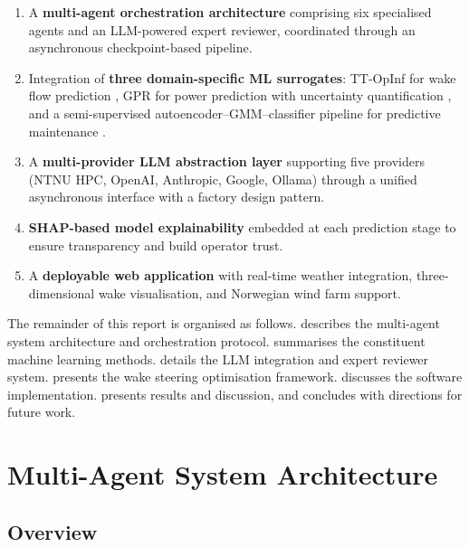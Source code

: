 \documentclass[12pt]{article}
\begin{document}
\begin{enumerate}[leftmargin=*]
    \item A \textbf{multi-agent orchestration architecture} comprising six specialised agents and an LLM-powered expert reviewer, coordinated through an asynchronous checkpoint-based pipeline.
    \item Integration of \textbf{three domain-specific ML surrogates}: TT-OpInf for wake flow prediction \citep{Tabib2025ttopinf}, GPR for power prediction with uncertainty quantification \citep{Tabib2025gpr}, and a semi-supervised autoencoder--GMM--classifier pipeline for predictive maintenance \citep{Tabib2025pdm}.
    \item A \textbf{multi-provider LLM abstraction layer} supporting five providers (NTNU HPC, OpenAI, Anthropic, Google, Ollama) through a unified asynchronous interface with a factory design pattern.
    \item \textbf{SHAP-based model explainability} embedded at each prediction stage to ensure transparency and build operator trust.
    \item A \textbf{deployable web application} with real-time weather integration, three-dimensional wake visualisation, and Norwegian wind farm support.
\end{enumerate}

The remainder of this report is organised as follows.
 describes the multi-agent system architecture and orchestration protocol.
 summarises the constituent machine learning methods.
 details the LLM integration and expert reviewer system.
 presents the wake steering optimisation framework.
 discusses the software implementation.
 presents results and discussion, and  concludes with directions for future work.


\section{Multi-Agent System Architecture}
\label{sec:architecture}

\subsection{Overview}
\label{sec:arch_overview}
\end{document}
